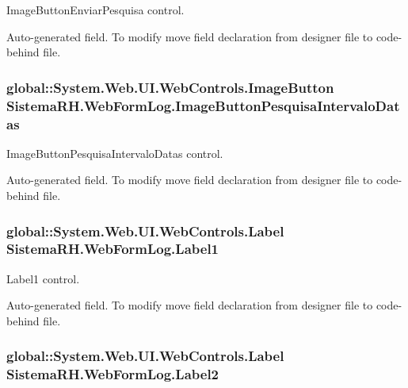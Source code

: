 ImageButtonEnviarPesquisa control. 

Auto-\/generated field. To modify move field declaration from designer file to code-\/behind file. \hypertarget{class_sistema_r_h_1_1_web_form_log_a68907ca0bcba3d5806d5c248eaa5665f}{
\subsubsection[{ImageButtonPesquisaIntervaloDatas}]{\setlength{\rightskip}{0pt plus 5cm}global::System.Web.UI.WebControls.ImageButton {\bf SistemaRH.WebFormLog.ImageButtonPesquisaIntervaloDatas}}}
\label{class_sistema_r_h_1_1_web_form_log_a68907ca0bcba3d5806d5c248eaa5665f}


ImageButtonPesquisaIntervaloDatas control. 

Auto-\/generated field. To modify move field declaration from designer file to code-\/behind file. \hypertarget{class_sistema_r_h_1_1_web_form_log_ab6184334e610eb3f6392a2e5dc16c167}{
\subsubsection[{Label1}]{\setlength{\rightskip}{0pt plus 5cm}global::System.Web.UI.WebControls.Label {\bf SistemaRH.WebFormLog.Label1}}}
\label{class_sistema_r_h_1_1_web_form_log_ab6184334e610eb3f6392a2e5dc16c167}


Label1 control. 

Auto-\/generated field. To modify move field declaration from designer file to code-\/behind file. \hypertarget{class_sistema_r_h_1_1_web_form_log_a038a355f0032298568246d0516bdc4a2}{
\subsubsection[{Label2}]{\setlength{\rightskip}{0pt plus 5cm}global::System.Web.UI.WebControls.Label {\bf SistemaRH.WebFormLog.Label2}}}
\label{class_sistema_r_h_1_1_web_form_log_a038a355f0032298568246d0516bdc4a2}


